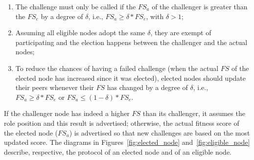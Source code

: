 \begin{enumerate}

\item The challenge must only be called if the $FS_a$ of the challenger is greater than the $FS_e$ by a degree of $\delta$, i.e., $FS_a \ge \delta * FS_e$, with $\delta > 1$;

\item Assuming all eligible nodes adopt the same $\delta$, they are exempt of participating and the election happens between the challenger and the actual nodes;

\item To reduce the chances of having a failed challenge (when the actual $FS$ of the elected node has increased since it was elected), elected nodes should update their peers whenever their $FS$ has changed by a degree of $\delta$, i.e., $FS_a \ge \delta * FS_e$ or $FS_a \le (1 - \delta) * FS_e$.

\end{enumerate}

If the challenger node has indeed a higher $FS$ than its challenger, it assumes the role position and this result is advertised; otherwise, the actual fitness score of the elected node ($FS_a$) is advertised so that new challenges are based on the most updated score. The diagrams in Figures~\ref{fig:elected_node} and~\ref{fig:eligible_node} describe, respective, the protocol of an elected node and of an eligible node.






%


